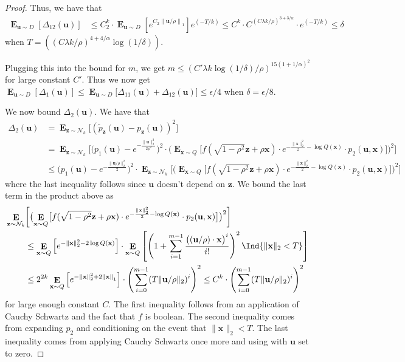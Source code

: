 \documentclass{theoretics}
\newcommand\twonorm[1]{\|#1\|_2}
\newcommand\norm[1]{\left\| #1 \right\|}
\renewcommand\vec[1]{\mathbf{#1}}
\DeclareMathOperator*{\E}{\mathbf{E}}
\newcommand{\1}{\Ind}
\newcommand{\x}{\vec x}
\newcommand{\vu}{\vec u}
\newcommand{\z}{\vec z}
\newcommand{\Gauss}{\mathcal{N}}
\begin{document}
\begin{proof}
      Thus, we have that 
      \begin{align*}
        \E_{\vu\sim D}\left[{\Delta_{12}(\vu)}\right]&\leq C_2^{k}\cdot \E_{\vu\sim D}\left[e^{C_2\norm{\vu/\rho}_1}\right]e^{(-T/k)}
        \leq C^k\cdot C^{(C\lambda k/\rho)^{3+3/\alpha}}\cdot e^{(-T/k)}
        \leq \delta
      \end{align*}
      when $T= ((C\lambda k/\rho)^{4+4/\alpha}\log (1/\delta) )$.  
      
      Plugging this into the bound for $m$, we get $m\leq (C'\lambda k\log(1/\delta)/\rho)^{15(1+1/\alpha)^2}$ for large constant $C'$. Thus we now get $ \E_{\vu\sim D}\left[\Delta_1(\vu)\right]\leq\E_{\vu\sim D}\bigl[{\Delta_{11}(\vu)+\Delta_{12}(\vu)}\bigr]\leq \epsilon/4$ when $\delta=\epsilon/8$.  
      
      We now bound $\Delta_2(\vu)$. We have that 
   \begin{align*}
    \Delta_2(\vu)&=\E_{\z\sim \Gauss_{k}}\bigl[(\tilde{p}_{\z}(\vu)-{p}_{\z}(\vu))^2\bigr]\\
   &=\E_{\z\sim \Gauss_{k}}\biggl[\bigl(p_1(\vu)-e^{-\frac{\twonorm{\vu}^2}{2\rho^2}}\bigr)^2\cdot \bigl(\E_{\x\sim Q}\bigl[f(\sqrt{1-\rho^2}\z+\rho\x)\cdot e^{-\frac{\twonorm{\x}^2}{2}-\log Q(\x)}\cdot p_2(\vu,\x)\bigr]\bigr)^2\biggr]\\ 
   &\leq  \bigl(p_1(\vu)-e^{-\frac{\twonorm{\vu/\rho}^2}{2}}\bigr)^2\cdot \E_{\z\sim \Gauss_{k}}\biggl[\bigl(\E_{\x\sim Q}\bigl[f(\sqrt{1-\rho^2}\z+\rho\x)\cdot e^{-\frac{\twonorm{\x}^2}{2}-\log Q(\x)}\cdot p_2(\vu,\x)\bigr]\bigr)^2\biggr]
\end{align*} where the last inequality follows since $\vu$ doesn't depend on $\z$. We bound the last term in the product above as
\begin{align*}
    \E_{\z\sim \Gauss_{k}}&\biggl[\bigl(\E_{\x\sim Q}\bigl[ f(\sqrt{1-\rho^2}\z+\rho\x)\cdot e^{-\frac{\twonorm{\x}^2}{2}-\log Q(\x)}\cdot p_2(\vu,\x)\bigr]\bigr)^2\biggr] \\&\leq {\E_{\x\sim Q}\left[e^{-\twonorm{\x}^2-2\log Q(\x)}\right]\cdot \E_{\x\sim Q}\left[\left(1+\sum_{i=1}^{m-1}\frac{\bigl((\vu/\rho)\cdot \x\bigr)^i}{i!}\right)^2\1\{\twonorm{\x}<T\}\right]}\\
    &\leq {2^{2k}\E_{\x\sim Q}\left[e^{-\twonorm{\x}^2+2\norm{\x}_1}\right]\cdot \left(\sum_{i=0}^{m-1}(T\twonorm{\vu/\rho})^i\right)^2}
    \leq C^{k}\cdot \left(\sum_{i=0}^{m-1}(T\twonorm{\vu/\rho})^i\right)^2
\end{align*}
for large enough constant $C$. The first inequality follows from an application of Cauchy Schwartz and the fact that $f$ is boolean. The second inequality comes from expanding $p_2$ and conditioning on the event that $\twonorm{\x}<T$. The last inequality comes from  applying Cauchy Schwartz once more and using  with $\vu$ set to zero.


\end{proof}
\end{document}
